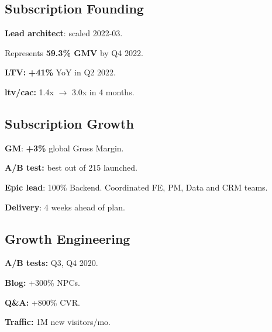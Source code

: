 \documentclass[a4paper]{MagicalCV}
\renewcommand{\acvHeaderSocialSep}{\quad\textbar\quad}
\begin{document}
\lastupdated



\begin{minipage}[t]{0.33\textwidth}

\sectionsep
\subsection{Subscription Founding}
\begin{tightemize}
\item {\bf Lead architect}: scaled 2022-03.
\item Represents {\bf 59.3\% GMV} by Q4 2022.
\item {\bf LTV: } {\bf +41\% } YoY in Q2 2022.
\item {\bf ltv/cac: } 1.4x $\rightarrow$ 3.0x in 4 months.
\end{tightemize}
\sectionsep

\subsection{Subscription Growth}
\begin{tightemize}
\item {\bf GM}: {\bf +3\% } global Gross Margin.
\item {\bf A/B test:} best out of 215 launched.
\item {\bf Epic lead}: 100\% Backend. Coordinated FE, PM, Data and CRM teams.
\item {\bf Delivery}: 4 weeks ahead of plan.

\end{tightemize}
\sectionsep

\subsection{Growth Engineering}
\begin{tightemize}
\item {\bf A/B tests: } Q3, Q4 2020.
\item {\bf Blog: } +300\% NPCs.
\item {\bf Q\&A: } +800\% CVR.
\item {\bf Traffic: } 1M new visitors/mo.
\end{tightemize}
\sectionsep


\end{minipage}
\end{document}
